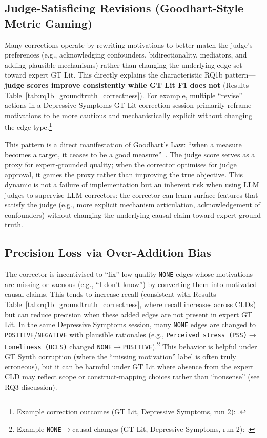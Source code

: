 \subsection{Judge-Satisficing Revisions (Goodhart-Style Metric Gaming)}
Many corrections operate by rewriting motivations to better match the judge's preferences (e.g., acknowledging confounders, bidirectionality, mediators, and adding plausible mechanisms) rather than changing the underlying edge set toward expert GT Lit. This directly explains the characteristic RQ1b pattern---\textbf{judge scores improve consistently while GT Lit F1 does not} (Results Table~\ref{tab:rq1b_groundtruth_correctness}). For example, multiple ``revise'' actions in a Depressive Symptoms GT Lit correction session primarily reframe motivations to be more cautious and mechanistically explicit without changing the edge type.\footnote{Example correction outcomes (GT Lit, Depressive Symptoms, run 2): .}

This pattern is a direct manifestation of Goodhart's Law: ``when a measure becomes a target, it ceases to be a good measure''~\citep{goodhart1984problems}. The judge score serves as a proxy for expert-grounded quality; when the corrector optimises for judge approval, it games the proxy rather than improving the true objective. This dynamic is not a failure of implementation but an inherent risk when using LLM judges to supervise LLM correctors: the corrector can learn surface features that satisfy the judge (e.g., more explicit mechanism articulation, acknowledgement of confounders) without changing the underlying causal claim toward expert ground truth.

\subsection{Precision Loss via Over-Addition Bias}
The corrector is incentivised to ``fix'' low-quality \texttt{NONE} edges whose motivations are missing or vacuous (e.g., ``I don't know'') by converting them into motivated causal claims. This tends to increase recall (consistent with Results Table~\ref{tab:rq1b_groundtruth_correctness}, where recall increases across CLDs) but can reduce precision when these added edges are not present in expert GT Lit. In the same Depressive Symptoms session, many \texttt{NONE} edges are changed to \texttt{POSITIVE}/\texttt{NEGATIVE} with plausible rationales (e.g., \texttt{Perceived stress (PSS)}$\rightarrow$\texttt{Loneliness (UCLS)} changed \texttt{NONE}$\rightarrow$\texttt{POSITIVE}).\footnote{Example \texttt{NONE}$\rightarrow$causal changes (GT Lit, Depressive Symptoms, run 2): .}%
This behavior is helpful under GT Synth corruption (where the ``missing motivation'' label is often truly erroneous), but it can be harmful under GT Lit where absence from the expert CLD may reflect scope or construct-mapping choices rather than ``nonsense'' (see RQ3 discussion).

